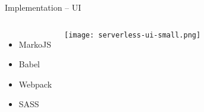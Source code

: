 

\begin{frame}{Implementation -- UI}
  \begin{columns}
      \begin{itemize}
        \item MarkoJS
        \item Babel
        \item Webpack
        \item SASS
      \end{itemize}
      \vfill
      \centering
      \texttt{[image: serverless-ui-small.png]}
   \end{columns}
\end{frame}
